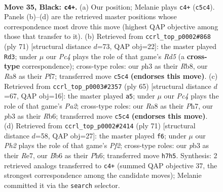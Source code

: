 \documentclass[11pt]{article}
\begin{document}
\clearpage

\begin{figure}[p]\centering
\begin{subfigure}{0.46\textwidth}\centering
\resizebox{\linewidth}{!}{%
\newchessgame
\chessboard[
  setfen={r5nr/p4k1p/1b6/2p2B2/5B2/PP5P/R1P3P1/1R4K1 b - - 2 35},
  showmover=false,
  pgfstyle=straightmove, color=movearrow, markmove={c5-c4}
]}
\caption{}
\end{subfigure}\hfill
\begin{subfigure}{0.46\textwidth}\centering
\resizebox{\linewidth}{!}{%
\newchessgame
\chessboard[
  setfen={1r4k1/5pp1/1n4p1/1P6/2pr3P/5P2/2R3P1/1R2B1K1 b - - 1 36},
  showmover=false,
  pgfstyle=straightmove, color=movearrow, markmove={d4-d3}
]}
\caption{}
\end{subfigure}
\\[4pt]
\begin{subfigure}{0.46\textwidth}\centering
\resizebox{\linewidth}{!}{%
\newchessgame
\chessboard[
  setfen={8/p1r1pk1p/1r4p1/2n5/2P5/4R1P1/P2R1P1P/5BK1 b - - 2 33},
  showmover=false,
  pgfstyle=straightmove, color=movearrow, markmove={a7-a5}
]}
\caption{}
\end{subfigure}\hfill
\begin{subfigure}{0.46\textwidth}\centering
\resizebox{\linewidth}{!}{%
\newchessgame
\chessboard[
  setfen={5r2/p3rp1k/3p3p/2pBb3/4P1P1/1P3K1P/P1R5/5R2 b - - 2 36},
  showmover=false,
  pgfstyle=straightmove, color=movearrow, markmove={f7-f6}
]}
\caption{}
\end{subfigure}
\caption{\textbf{Move 35, Black: \texttt{c4+}.} (a) Our position; Melanie plays \texttt{c4+} (\texttt{c5c4}). Panels (b)--(d) are the retrieved master positions whose correspondence most drove this move (highest QAP objective among those that transfer to it). (b) Retrieved from \texttt{ccrl\_top\_p0002\#868} (ply 71) [structural distance $d$=73, QAP obj=22]: the master played \texttt{Rd3}; under $\mu$ our \emph{Pc4} plays the role of that game's \emph{Rd5} (a \textbf{cross-type} correspondence); cross-type roles: our \emph{p}h3 as their \emph{R}b8, our \emph{R}a8 as their \emph{P}f7; transferred move \texttt{c5c4} \textbf{(endorses this move)}. (c) Retrieved from \texttt{ccrl\_top\_p0003\#2357} (ply 65) [structural distance $d$=67, QAP obj=16]: the master played \texttt{a5}; under $\mu$ our \emph{Pc4} plays the role of that game's \emph{Pa2}; cross-type roles: our \emph{R}a8 as their \emph{P}h7, our \emph{p}b3 as their \emph{R}b6; transferred move \texttt{c5c4} \textbf{(endorses this move)}. (d) Retrieved from \texttt{ccrl\_top\_p0002\#2414} (ply 71) [structural distance $d$=58, QAP obj=27]: the master played \texttt{f6}; under $\mu$ our \emph{Ph2} plays the role of that game's \emph{Pf2}; cross-type roles: our \emph{p}b3 as their \emph{R}e7, our \emph{B}b6 as their \emph{P}h6; transferred move \texttt{h7h5}. Synthesis: 2 retrieved analogs transferred to \texttt{c4+} (summed QAP objective 37, the strongest correspondence among the candidate moves); Melanie committed it via the \texttt{search} selector.}
\label{fig:thought-m69}
\end{figure}
\end{document}
